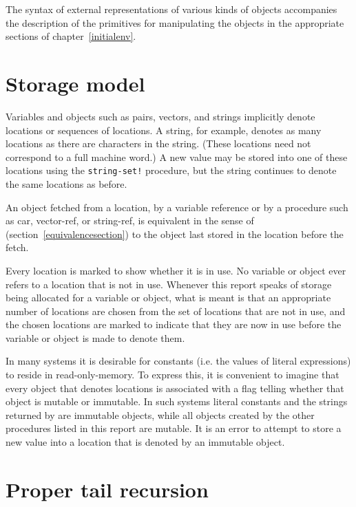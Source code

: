 The syntax of external representations of various kinds of objects
accompanies the description of the primitives for manipulating the
objects in the appropriate sections of chapter~\ref{initialenv}.

\section{Storage model}
\label{storagemodel}

Variables and objects such as pairs, vectors, and strings implicitly
denote locations or sequences of locations.  A string, for
example, denotes as many locations as there are characters in the string. 
(These locations need not correspond to a full machine word.) A new value may be
stored into one of these locations using the {\tt string-set!} procedure, but
the string continues to denote the same locations as before.

An object fetched from a location, by a variable reference or by
a procedure such as {\cf car}, {\cf vector-ref}, or {\cf string-ref}, is
equivalent in the sense of  %
(section~\ref{equivalencesection})
to the object last stored in the location before the fetch.

Every location is marked to show whether it is in use.
No variable or object ever refers to a location that is not in use.
Whenever this report speaks of storage being allocated for a variable
or object, what is meant is that an appropriate number of locations are
chosen from the set of locations that are not in use, and the chosen
locations are marked to indicate that they are now in use before the variable
or object is made to denote them.

In many systems it is desirable for constants (i.e. the values of
literal expressions) to reside in read-only-memory.  To express this, it is
convenient to imagine that every object that denotes locations is associated
with a flag telling whether that object is mutable or
immutable.  In such systems literal constants and the strings
returned by  are immutable objects, while all objects
created by the other procedures listed in this report are mutable.  It is an
error to attempt to store a new value into a location that is denoted by an
immutable object.

\section{Proper tail recursion}
\label{proper tail recursion}

